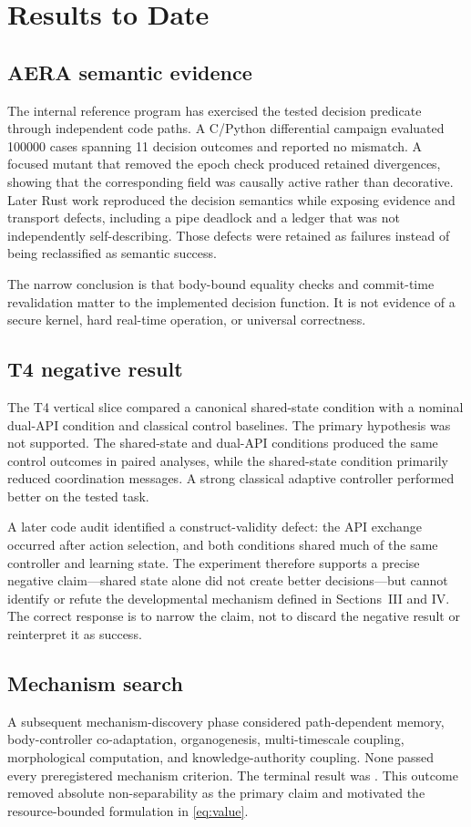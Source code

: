 \documentclass[journal,10pt]{IEEEtran}
\newcommand{\Code}[1]{\texttt{\detokenize{#1}}}
\begin{document}
\section{Results to Date}
\subsection{AERA semantic evidence}
The internal reference program has exercised the tested decision predicate through independent code paths. A C/Python differential campaign evaluated \num{100000} cases spanning 11 decision outcomes and reported no mismatch. A focused mutant that removed the epoch check produced retained divergences, showing that the corresponding field was causally active rather than decorative. Later Rust work reproduced the decision semantics while exposing evidence and transport defects, including a pipe deadlock and a ledger that was not independently self-describing. Those defects were retained as failures instead of being reclassified as semantic success.

The narrow conclusion is that body-bound equality checks and commit-time revalidation matter to the implemented decision function. It is not evidence of a secure kernel, hard real-time operation, or universal correctness.

\subsection{T4 negative result}
The T4 vertical slice compared a canonical shared-state condition with a nominal dual-API condition and classical control baselines. The primary hypothesis was not supported. The shared-state and dual-API conditions produced the same control outcomes in paired analyses, while the shared-state condition primarily reduced coordination messages. A strong classical adaptive controller performed better on the tested task.

A later code audit identified a construct-validity defect: the API exchange occurred after action selection, and both conditions shared much of the same controller and learning state. The experiment therefore supports a precise negative claim---shared state alone did not create better decisions---but cannot identify or refute the developmental mechanism defined in Sections~III and IV. The correct response is to narrow the claim, not to discard the negative result or reinterpret it as success.

\subsection{Mechanism search}
A subsequent mechanism-discovery phase considered path-dependent memory, body-controller co-adaptation, organogenesis, multi-timescale coupling, morphological computation, and knowledge-authority coupling. None passed every preregistered mechanism criterion. The terminal result was \Code{MECHANISM_NOT_IDENTIFIED}. This outcome removed absolute non-separability as the primary claim and motivated the resource-bounded formulation in \eqref{eq:value}.
\end{document}
